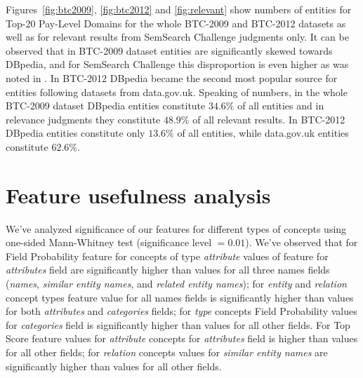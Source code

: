 \documentclass{article}
\begin{document}
Figures~\ref{fig:btc2009}, \ref{fig:btc2012} and \ref{fig:relevant} show numbers
of entities for Top-20 Pay-Level Domains for the whole BTC-2009 and BTC-2012
datasets as well as for relevant results from SemSearch Challenge judgments
only. It can be observed that in BTC-2009 dataset entities are significantly
skewed towards DBpedia, and for SemSearch Challenge this disproportion is even
higher as was noted in \cite{balog2013test}. In BTC-2012 DBpedia became the
second most popular source for entities following datasets from data.gov.uk.
Speaking of numbers, in the whole BTC-2009 dataset DBpedia entities constitute
$34.6\%$ of all entities and in relevance judgments they constitute $48.9\%$ of
all relevant results. In BTC-2012 DBpedia entities constitute only $13.6\%$ of
all entities, while data.gov.uk entities constitute $62.6\%$.


\section{Feature usefulness analysis}

We've analyzed significance of our features for different types of concepts
using one-sided Mann-Whitney test (significance level $= 0.01$). We've observed
that for Field Probability feature for concepts of type \emph{attribute} values
of feature for \emph{attributes} field are significantly higher than values for
all three names fields (\emph{names}, \emph{similar entity names}, and
\emph{related entity names}); for \emph{entity} and \emph{relation} concept
types feature value for all names fields is significantly higher than values for
both \emph{attributes} and \emph{categories} fields; for \emph{type} concepts
Field Probability values for \emph{categories} field is significantly higher than values
for all other fields. For Top Score feature values for \emph{attribute} concepts
for \emph{attributes} field is higher than values for all other fields; for
\emph{relation} concepts values for \emph{similar entity names} are
significantly higher than values for all other fields.

{}

\end{document}
